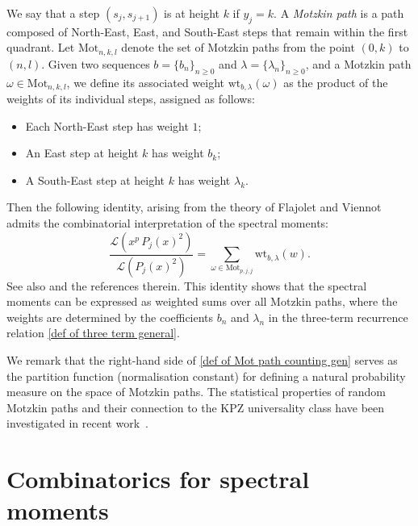 \documentclass{amsart}
\def\wt{\widetilde}
\def\Mot{ \mathrm{Mot}}
\def\wt{ \mathrm{wt}}
\theoremstyle{plain}
\theoremstyle{remark}
\numberwithin{equation}{section}
\begin{document}
We say that a step $(s_j, s_{j+1})$ is at height $k$ if $y_j = k$. 
A \emph{Motzkin path} is a path composed of North-East, East, and South-East steps that remain within the first quadrant.
Let $\Mot_{n,k,l}$ denote the set of Motzkin paths from the point $(0, k)$ to $(n, l)$. Given two sequences $b = \{ b_n \}_{n \geq 0}$ and $\lambda = \{ \lambda_n \}_{n \geq 0}$, and a Motzkin path $\omega \in \Mot_{n,k,l}$, we define its associated weight $\wt_{b,\lambda}(\omega)$ as the product of the weights of its individual steps, assigned as follows:
\begin{itemize}
    \item Each North-East step has weight $1$;
    \smallskip 
    \item An East step at height $k$ has weight $b_k$;
     \smallskip 
    \item A South-East step at height $k$ has weight $\lambda_k$.
\end{itemize}
Then the following identity, arising from the theory of Flajolet \cite{Fl80} and Viennot \cite{Vi00} admits the combinatorial interpretation of the spectral moments: 
\begin{equation} \label{def of Mot path counting gen}
 \frac{  \mathcal{L}(  x^p \,P_j(x)^2) }{  \mathcal{L}( P_j(x)^2 )  } =\sum_{\omega\in\mathrm{Mot}_{p,j,j}}\mathrm{wt}_{b,\lambda}(w).  
\end{equation}
See also \cite[Proposition 3.2]{BFO24} and the references therein. This identity shows that the spectral moments can be expressed as weighted sums over all Motzkin paths, where the weights are determined by the coefficients \( b_n \) and \( \lambda_n \) in the three-term recurrence relation \eqref{def of three term general}.

We remark that the right-hand side of \eqref{def of Mot path counting gen} serves as the partition function (normalisation constant) for defining a natural probability measure on the space of Motzkin paths. The statistical properties of random Motzkin paths and their connection to the KPZ universality class have been investigated in recent work~\cite{BKW25}.






  










\section{Combinatorics for spectral moments} \label{Section_spectral moments}
\end{document}
